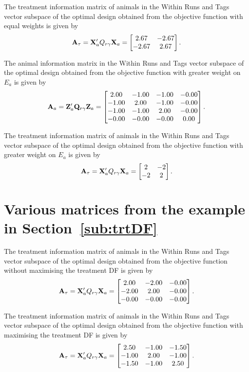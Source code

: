 The treatment information matrix of animals in the Within Runs and Tags vector subspace of the optimal design obtained from the objective function with equal weights is given by 
\[
\mathbf{A}_{\tau} = 
 \mathbf{X}_{a}' Q_{r\gamma} \mathbf{X}_{a} = 
\begin{bmatrix} 
2.67 & -2.67 \\ 
-2.67 & 2.67 \\ 
\end{bmatrix}.  
\]


The animal information matrix in the Within Runs and Tags vector subspace of the optimal design obtained from the objective function with greater weight on $E_a$ is given by 
\[
\mathbf{A}_{a} = 
 \mathbf{Z}_{a}' \mathbf{Q}_{r\gamma} \mathbf{Z}_{a} = 
\begin{bmatrix} 
 2.00 & -1.00 & -1.00 & -0.00 \\ 
  -1.00 & 2.00 & -1.00 & -0.00 \\ 
  -1.00 & -1.00 & 2.00 & -0.00 \\ 
  -0.00 & -0.00 & -0.00 & 0.00 \\ 
\end{bmatrix}.  
\]

The treatment information matrix of animals in the Within Runs and Tags vector subspace of the optimal design obtained from the objective function with greater weight on $E_a$ is given by 
\[
\mathbf{A}_{\tau} = 
 \mathbf{X}_{a}' Q_{r\gamma} \mathbf{X}_{a} = 
\begin{bmatrix} 
 2 & -2 \\ 
 -2 & 2 \\ 
\end{bmatrix}.  
\]

\chapter{Various matrices from the example in Section~\ref{sub:trtDF}} \label{append:trtDF}
The treatment information matrix of animals in the Within Runs and Tags vector subspace of the optimal design obtained from the objective function without maximising the treatment DF is given by 
\[
\mathbf{A}_{\tau} = 
 \mathbf{X}_{a}' Q_{r\gamma} \mathbf{X}_{a} = 
\begin{bmatrix} 
  2.00 & -2.00 & -0.00 \\ 
  -2.00 & 2.00 & -0.00 \\ 
  -0.00 & -0.00 & -0.00 \\ 
\end{bmatrix}.  
\]

The treatment information matrix of animals in the Within Runs and Tags vector subspace of the optimal design obtained from the objective function with maximising the treatment DF is given by 
\[
\mathbf{A}_{\tau} = 
 \mathbf{X}_{a}' Q_{r\gamma} \mathbf{X}_{a} = 
\begin{bmatrix} 
  2.50 & -1.00 & -1.50 \\ 
  -1.00 & 2.00 & -1.00 \\ 
  -1.50 & -1.00 & 2.50 \\ 
\end{bmatrix}.  
\]


